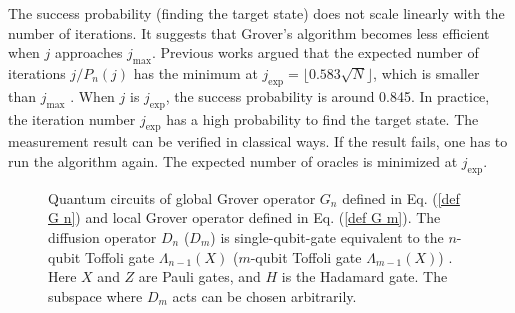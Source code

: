 \documentclass[%
 twocolumn,
 10pt,
 superscriptaddress,
 longbibliography,
 amsmath,amssymb,
 aps,
 pra,
floatfix,
]{revtex4-1}
\begin{document}
The success probability (finding the target state) does not scale linearly with the number of iterations. It suggests that Grover's algorithm becomes less efficient when $j$ approaches $j_\text{max}$. Previous works argued that the expected number of iterations $j/P_n(j)$ has the minimum at $j_\text{exp}=\lfloor 0.583\sqrt N \rfloor$, which is smaller than $j_\text{max}$ \cite{BBHT98,GWC00}. When $j$ is $j_\text{exp}$, the success probability is around 0.845. In practice, the iteration number $j_\text{exp}$ has a high probability to find the target state. The measurement result can be verified in classical ways. If the result fails, one has to run the algorithm again. The expected number of oracles is minimized at $j_\text{exp}$.

\begin{figure}
\hfill
{}
\caption{Quantum circuits of global Grover operator $G_n$ defined in Eq. (\ref{def G n}) and local Grover operator defined in Eq. (\ref{def G m}). The diffusion operator $D_n$ ($D_m$) is single-qubit-gate equivalent to the $n$-qubit Toffoli gate $\Lambda_{n-1}(X)$ ($m$-qubit Toffoli gate $\Lambda_{m-1}(X)$) \cite{NC10}. Here $X$ and $Z$ are Pauli gates, and $H$ is the Hadamard gate. The subspace where $D_m$ acts can be chosen arbitrarily.}
\label{fig G n m}
\end{figure}
\end{document}
